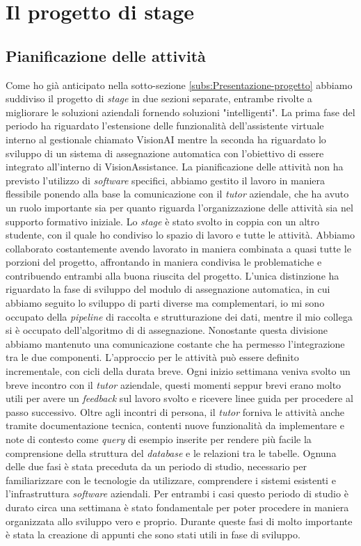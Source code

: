 \chapter{Il progetto di stage}
\label{chap:I-progetti-di-stage}

\section {Pianificazione delle attività}
\label{sec:pianificazione-attività}
Come ho già anticipato nella sotto-sezione \ref{subs:Presentazione-progetto} abbiamo suddiviso il progetto di \textit{stage} in due sezioni separate, entrambe rivolte a migliorare le soluzioni aziendali fornendo soluzioni "intelligenti".
La prima fase del periodo ha riguardato l'estensione delle funzionalità dell'assistente virtuale interno al gestionale chiamato VisionAI mentre la seconda ha riguardato lo sviluppo di un sistema di assegnazione automatica con l'obiettivo di essere integrato all'interno di VisionAssistance.
La pianificazione delle attività non ha previsto l'utilizzo di \textit{software} specifici, abbiamo gestito il lavoro in maniera flessibile ponendo alla base la comunicazione con il \textit{tutor} aziendale, che ha avuto un ruolo importante sia per quanto riguarda l'organizzazione delle attività sia nel supporto formativo iniziale.
Lo \textit{stage} è stato svolto in coppia con un altro studente, con il quale ho condiviso lo spazio di lavoro e tutte le attività. Abbiamo collaborato costantemente avendo lavorato in maniera combinata a quasi tutte le porzioni del progetto, affrontando in maniera condivisa le problematiche e contribuendo entrambi alla buona riuscita del progetto.
L'unica distinzione ha riguardato la fase di sviluppo del modulo di assegnazione automatica, in cui abbiamo seguito lo sviluppo di parti diverse ma complementari, io mi sono occupato della \textit{pipeline} di raccolta e strutturazione dei dati, mentre il mio collega si è occupato dell'algoritmo di di assegnazione. Nonostante questa divisione abbiamo mantenuto una comunicazione costante che ha permesso l'integrazione tra le due componenti.
L'approccio per le attività può essere definito incrementale, con cicli della durata breve. Ogni inizio settimana veniva svolto un breve incontro con il \textit{tutor} aziendale, questi momenti seppur brevi erano molto utili per avere un \textit{feedback} sul lavoro svolto e ricevere linee guida per procedere al passo successivo.
Oltre agli incontri di persona, il \textit{tutor} forniva le attività anche tramite documentazione tecnica, contenti nuove funzionalità da implementare e note di contesto come \textit{query} di esempio inserite per rendere più facile la comprensione della struttura del \textit{database} e le relazioni tra le tabelle.
Ognuna delle due fasi è stata preceduta da un periodo di studio, necessario per familiarizzare con le tecnologie da utilizzare, comprendere i sistemi esistenti e l'infrastruttura \textit{software} aziendali. Per entrambi i casi questo periodo di studio è durato circa una settimana è stato fondamentale per poter procedere in maniera organizzata allo sviluppo vero e proprio. Durante queste fasi di molto importante è stata la creazione di appunti che sono stati utili in fase di sviluppo.



